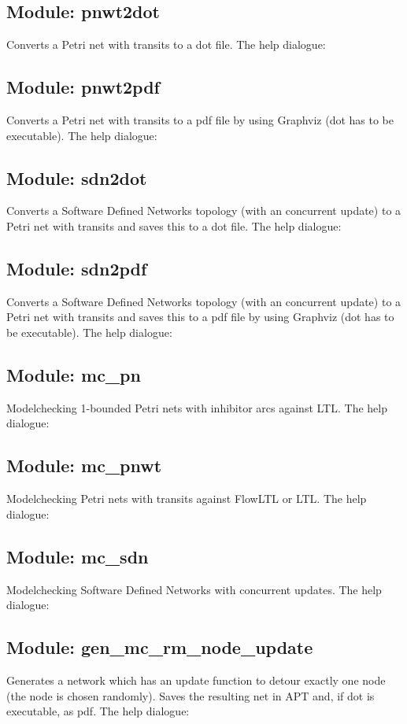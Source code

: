 \subsection*{Module: pnwt2dot}
Converts a Petri net with transits to a dot file. The help dialogue: 

\subsection*{Module: pnwt2pdf}
Converts a Petri net with transits to a pdf file by using Graphviz (dot has to be executable). The help dialogue: 

\subsection*{Module: sdn2dot}
Converts a Software Defined Networks topology (with an concurrent update) to a Petri net with transits and saves this to a dot file. The help dialogue: 

\subsection*{Module: sdn2pdf}
Converts a Software Defined Networks topology (with an concurrent update) to a Petri net with transits and saves this to a pdf file by using Graphviz (dot has to be executable). The help dialogue: 

\subsection*{Module: mc\_pn}
Modelchecking 1-bounded Petri nets with inhibitor arcs against LTL. The help dialogue: 

\subsection*{Module: mc\_pnwt}
Modelchecking Petri nets with transits against FlowLTL  or LTL. The help dialogue: 

\subsection*{Module: mc\_sdn}
Modelchecking Software Defined Networks with concurrent updates. The help dialogue: 

\subsection*{Module: gen\_mc\_rm\_node\_update}
Generates a network which has an update function to detour exactly one node (the node is chosen randomly). Saves the resulting net in APT and, if dot is executable, as pdf. The help dialogue: 

